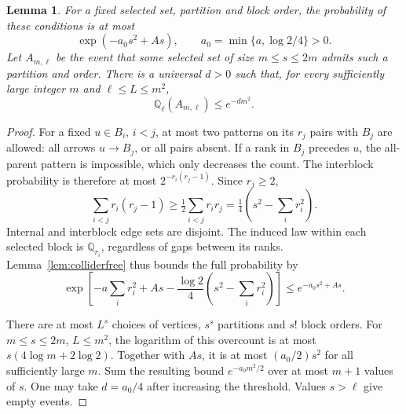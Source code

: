 \documentclass[11pt]{article}
\newtheorem{lemma}[theorem]{Lemma}
\theoremstyle{remark}
\newcommand{\Q}{\mathbb Q}
\begin{document}
\begin{lemma}\label{lem:partition}
For a fixed selected set, partition and block order, the probability of
these conditions is at most
\begin{equation}\label{eq:fixedpartition}
 \exp(-a_0s^2+As),\qquad a_0=\min\{a,\log2/4\}>0.
\end{equation}
Let $A_{m,\ell}$ be the event that some selected set of size
$m\le s\le2m$ admits such a partition and order. There is a universal
$d>0$ such that, for every sufficiently large integer $m$ and
$\ell\le L\le m^2$,
\begin{equation}\label{eq:partition}
 \Q_\ell(A_{m,\ell})\le e^{-dm^2}.
\end{equation}
\end{lemma}
\begin{proof}
For a fixed $u\in B_i$, $i<j$, at most two patterns on its $r_j$ pairs
with $B_j$ are allowed: all arrows $u\to B_j$, or all pairs absent.
If a rank in $B_j$ precedes $u$, the all-parent pattern is impossible,
which only decreases the count. The interblock probability is therefore
at most $2^{-r_i(r_j-1)}$. Since $r_j\ge2$,
\[
 \sum_{i<j}r_i(r_j-1)
 \ge\tfrac12\sum_{i<j}r_ir_j
 =\tfrac14\left(s^2-\sum_i r_i^2\right).
\]
Internal and interblock edge sets are disjoint. The induced law within
each selected block is $\Q_{r_i}$, regardless of gaps between its ranks.
Lemma~\ref{lem:colliderfree} thus bounds the full probability by
\[
 \exp\left[-a\sum_i r_i^2+As
       -\frac{\log2}{4}\left(s^2-\sum_i r_i^2\right)\right]
 \le e^{-a_0s^2+As}.
\]

There are at most $L^s$ choices of vertices, $s^s$ partitions and $s!$
block orders. For $m\le s\le2m$, $L\le m^2$, the logarithm of this
overcount is at most $s(4\log m+2\log2)$. Together with $As$, it is
at most $(a_0/2)s^2$ for all sufficiently large $m$. Sum the resulting
bound $e^{-a_0m^2/2}$ over at most $m+1$ values of $s$.
One may take $d=a_0/4$ after increasing the threshold. Values $s>\ell$
give empty events.
\end{proof}
\end{document}
